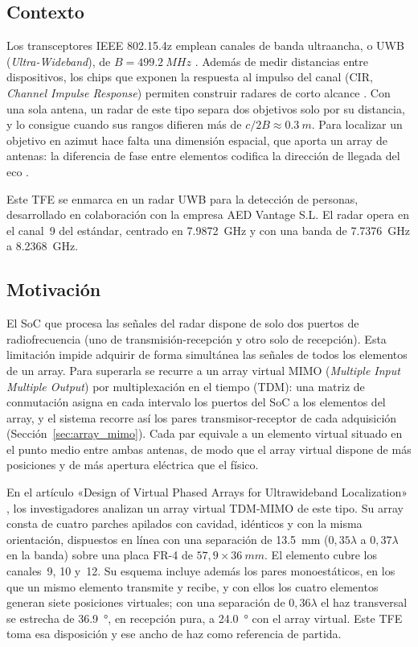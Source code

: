 \documentclass[11pt,a4paper]{article}
\begin{document}
\subsection{Contexto}
Los transceptores IEEE 802.15.4z emplean canales de banda ultraancha, o UWB
(\textit{Ultra-Wideband}), de $B = \SI{499.2}{MHz}$ \cite{ieee802154z2020}. Además de medir
distancias entre dispositivos, los chips que exponen la respuesta al impulso del canal (CIR,
\textit{Channel Impulse Response}) permiten construir radares de corto alcance
\cite{cheraghinia2024uwbradar}. Con una sola antena, un radar de este tipo separa dos objetivos
solo por su distancia, y lo consigue cuando sus rangos difieren más de $c/2B \approx \SI{0.3}{m}$.
Para localizar un objetivo en azimut hace falta una dimensión espacial, que aporta un array de
antenas: la diferencia de fase entre elementos codifica la dirección de llegada del eco
\cite{vantrees2002array}.

Este TFE se enmarca en un radar UWB para la detección de personas, desarrollado en colaboración
con la empresa AED Vantage S.L. El radar opera en el canal~9 del estándar, centrado en
\SI{7.9872}{GHz} y con una banda de \SI{7.7376}{GHz} a \SI{8.2368}{GHz}.

\subsection{Motivación}
El SoC que procesa las señales del radar dispone de solo dos puertos de radiofrecuencia (uno de
transmisión-recepción y otro solo de recepción). Esta limitación impide adquirir de forma simultánea las señales de todos los
elementos de un array. Para superarla se recurre a un array virtual MIMO
(\textit{Multiple Input Multiple Output}) por multiplexación en el tiempo (TDM): una matriz de
conmutación asigna en cada intervalo los puertos del SoC a los elementos del array, y el
sistema recorre así los pares transmisor-receptor de cada adquisición (Sección~\ref{sec:array_mimo}). Cada par equivale a un elemento virtual
situado en el punto medio entre ambas antenas, de modo que el array virtual dispone de más
posiciones y de más apertura eléctrica que el físico.

En el artículo «Design of Virtual Phased Arrays for Ultrawideband Localization» \cite{carretero2027vpa},
los investigadores analizan un array virtual TDM-MIMO de este tipo. Su array consta de cuatro parches apilados con cavidad, idénticos y con
la misma orientación, dispuestos en línea con una separación de \SI{13.5}{mm} ($0{,}35\lambda$ a
$0{,}37\lambda$ en la banda) sobre una placa FR-4 de $57{,}9 \times \SI{36}{mm}$. El elemento
cubre los canales~9, 10 y~12. Su esquema incluye además los pares monoestáticos, en los que un
mismo elemento transmite y recibe, y con ellos los cuatro elementos generan siete posiciones
virtuales; con una
separación de $0{,}36\lambda$ el haz transversal se estrecha de \SI{36.9}{\degree}, en recepción
pura, a \SI{24.0}{\degree} con el array virtual. Este TFE toma esa disposición y ese ancho de haz
como referencia de partida.
\end{document}
